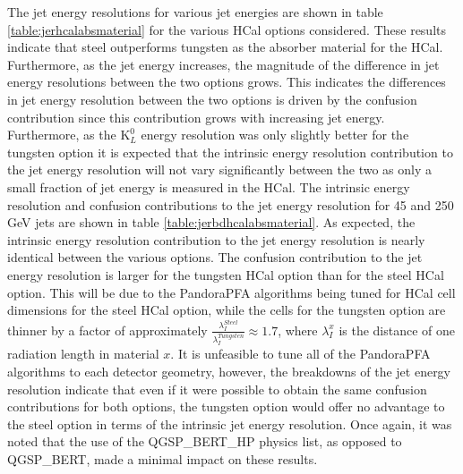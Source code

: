 The jet energy resolutions for various jet energies are shown in table \ref{table:jerhcalabsmaterial} for the various HCal options considered.  These results indicate that steel outperforms tungsten as the absorber material for the HCal.  Furthermore, as the jet energy increases, the magnitude of the difference in jet energy resolutions between the two options grows.  This indicates the differences in jet energy resolution between the two options is driven by the confusion contribution since this contribution grows with increasing jet energy.  Furthermore, as the $\text{K}^{0}_{L}$ energy resolution was only slightly better for the tungsten option it is expected that the intrinsic energy resolution contribution to the jet energy resolution will not vary significantly between the two as only a small fraction of jet energy is measured in the HCal.  The intrinsic energy resolution and confusion contributions to the jet energy resolution for 45 and 250 GeV jets are shown in table \ref{table:jerbdhcalabsmaterial}.  As expected, the intrinsic energy resolution contribution to the jet energy resolution is nearly identical between the various options.  The confusion contribution to the jet energy resolution is larger for the tungsten HCal option than for the steel HCal option.  This will be due to the PandoraPFA algorithms being tuned for HCal cell dimensions for the steel HCal option, while the cells for the tungsten option are thinner by a factor of approximately $\frac{\lambda_{I}^{Steel}}{\lambda_{I}^{Tungsten}} \approx 1.7$, where $\lambda_{I}^{x}$ is the distance of one radiation length in material $x$.  It is unfeasible to tune all of the PandoraPFA algorithms to each detector geometry, however, the breakdowns of the jet energy resolution indicate that even if it were possible to obtain the same confusion contributions for both options, the tungsten option would offer no advantage to the steel option in terms of the intrinsic jet energy resolution.  Once again, it was noted that the use of the QGSP\_BERT\_HP physics list, as opposed to QGSP\_BERT, made a minimal impact on these results.

